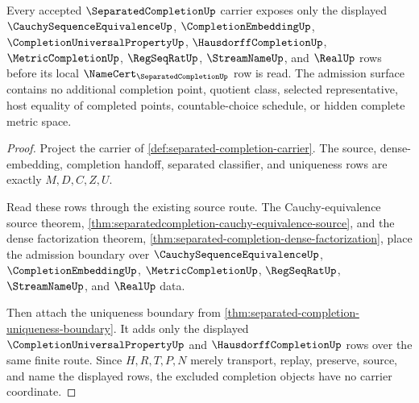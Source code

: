 \begin{theorem}
\label{thm:separated-completion-carrier-admission-root-obligation}
Every accepted $\SeparatedCompletionUp$ carrier exposes only the displayed $\CauchySequenceEquivalenceUp$, $\CompletionEmbeddingUp$, $\CompletionUniversalPropertyUp$, $\HausdorffCompletionUp$, $\MetricCompletionUp$, $\RegSeqRatUp$, $\StreamNameUp$, and $\RealUp$ rows before its local $\NameCert_{\SeparatedCompletionUp}$ row is read. The admission surface contains no additional completion point, quotient class, selected representative, host equality of completed points, countable-choice schedule, or hidden complete metric space.
\end{theorem}
\begin{proof}
Project the carrier of \autoref{def:separated-completion-carrier}. The source, dense-embedding, completion handoff, separated classifier, and uniqueness rows are exactly $M,D,C,Z,U$.

Read these rows through the existing source route. The Cauchy-equivalence source theorem, \autoref{thm:separatedcompletion-cauchy-equivalence-source}, and the dense factorization theorem, \autoref{thm:separated-completion-dense-factorization}, place the admission boundary over $\CauchySequenceEquivalenceUp$, $\CompletionEmbeddingUp$, $\MetricCompletionUp$, $\RegSeqRatUp$, $\StreamNameUp$, and $\RealUp$ data.

Then attach the uniqueness boundary from \autoref{thm:separated-completion-uniqueness-boundary}. It adds only the displayed $\CompletionUniversalPropertyUp$ and $\HausdorffCompletionUp$ rows over the same finite route. Since $H,R,T,P,N$ merely transport, replay, preserve, source, and name the displayed rows, the excluded completion objects have no carrier coordinate.
\end{proof}

